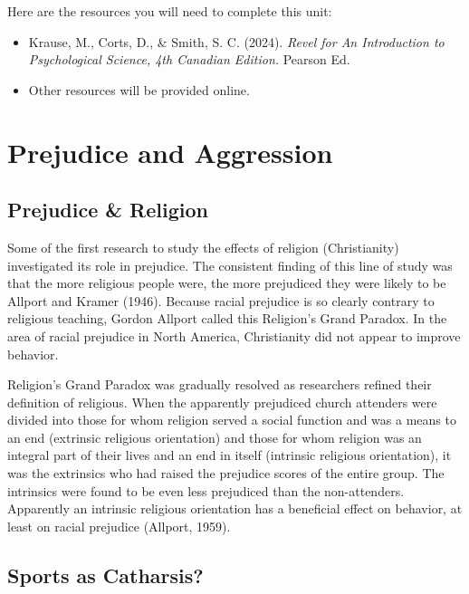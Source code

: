 \documentclass[
]{book}
\providecommand{\tightlist}{%
  \setlength{\itemsep}{0pt}\setlength{\parskip}{0pt}}
\begin{document}
Here are the resources you will need to complete this unit:

\begin{itemize}
\tightlist
\item
  Krause, M., Corts, D., \& Smith, S. C. (2024). \emph{Revel for An Introduction to Psychological Science, 4th Canadian Edition.} Pearson Ed.
\item
  Other resources will be provided online.
\end{itemize}

\hypertarget{prejudice-and-aggression}{%
\section{Prejudice and Aggression}\label{prejudice-and-aggression}}

\hypertarget{prejudice-religion}{%
\subsection*{Prejudice \& Religion}\label{prejudice-religion}}

Some of the first research to study the effects of religion (Christianity) investigated its role in prejudice. The consistent finding of this line of study was that the more religious people were, the more prejudiced they were likely to be Allport and Kramer (1946). Because racial prejudice is so clearly contrary to religious teaching, Gordon Allport called this Religion's Grand Paradox. In the area of racial prejudice in North America, Christianity did not appear to improve behavior.

Religion's Grand Paradox was gradually resolved as researchers refined their definition of religious. When the apparently prejudiced church attenders were divided into those for whom religion served a social function and was a means to an end (extrinsic religious orientation) and those for whom religion was an integral part of their lives and an end in itself (intrinsic religious orientation), it was the extrinsics who had raised the prejudice scores of the entire group. The intrinsics were found to be even less prejudiced than the non-attenders. Apparently an intrinsic religious orientation has a beneficial effect on behavior, at least on racial prejudice (Allport, 1959).

\hypertarget{sports-as-catharsis}{%
\subsection*{Sports as Catharsis?}\label{sports-as-catharsis}}
\end{document}
